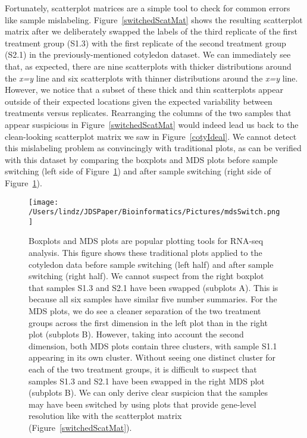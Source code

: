 \documentclass{bioinfo}
\begin{document}
Fortunately, scatterplot matrices are a simple tool to check for common errors like sample mislabeling. Figure~\ref{switchedScatMat} shows the resulting scatterplot matrix after we deliberately swapped the labels of the third replicate of the first treatment group (S1.3) with the first replicate of the second treatment group (S2.1) in the previously-mentioned cotyledon dataset. We can immediately see that, as expected, there are nine scatterplots with thicker distributions around the \textit{x=y} line and six scatterplots with thinner distributions around the \textit{x=y} line. However, we notice that a subset of these thick and thin scatterplots appear outside of their expected locations given the expected variability between treatments versus replicates. Rearranging the columns of the two samples that appear suspicious in Figure~\ref{switchedScatMat} would indeed lead us back to the clean-looking scatterplot matrix we saw in Figure~\ref{cotyIdeal}. We cannot detect this mislabeling problem as convincingly with traditional plots, as can be verified with this dataset by comparing the boxplots and MDS plots before sample switching (left side of Figure~\ref{mdsSwitch}) and after sample switching (right side of Figure~\ref{mdsSwitch}). 

\begin{figure}[!tpb]
\centerline{\texttt{[image: /Users/lindz/JDSPaper/Bioinformatics/Pictures/mdsSwitch.png]}}
\caption{Boxplots and MDS plots are popular plotting tools for RNA-seq analysis. This figure shows these traditional plots applied to the cotyledon data before sample switching (left half) and after sample switching (right half). We cannot suspect from the right boxplot that samples S1.3 and S2.1 have been swapped (subplots A). This is because all six samples have similar five number summaries. For the MDS plots, we do see a cleaner separation of the two treatment groups across the first dimension in the left plot than in the right plot (subplots B). However, taking into account the second dimension, both MDS plots contain three clusters, with sample S1.1 appearing in its own cluster. Without seeing one distinct cluster for each of the two treatment groups, it is difficult to suspect that samples S1.3 and S2.1 have been swapped in the right MDS plot (subplots B). We can only derive clear suspicion that the samples may have been switched by using plots that provide gene-level resolution like with the scatterplot matrix (Figure~\ref{switchedScatMat}).
\label{mdsSwitch}}
\end{figure}
\end{document}
